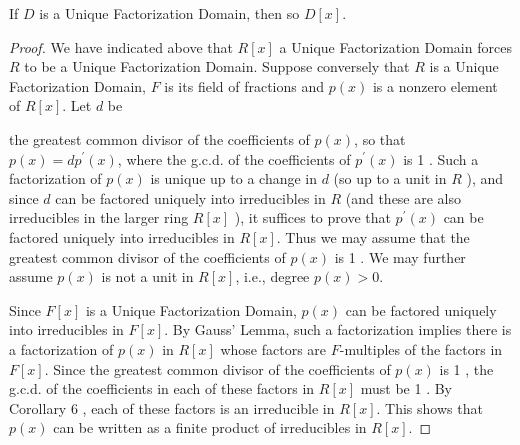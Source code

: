 \begin{theorem}
    If $D$ is a Unique Factorization Domain, then so $D[x]$.

    \begin{proof}
        We have indicated above that $R[x]$ a Unique Factorization Domain forces $R$ to be a Unique Factorization Domain. Suppose conversely that $R$ is a Unique Factorization Domain, $F$ is its field of fractions and $p(x)$ is a nonzero element of $R[x]$. Let $d$ be

        the greatest common divisor of the coefficients of $p(x)$, so that $p(x)=d p^{\prime}(x)$, where the g.c.d. of the coefficients of $p^{\prime}(x)$ is 1 . Such a factorization of $p(x)$ is unique up to a change in $d$ (so up to a unit in $R$ ), and since $d$ can be factored uniquely into irreducibles in $R$ (and these are also irreducibles in the larger ring $R[x]$ ), it suffices to prove that $p^{\prime}(x)$ can be factored uniquely into irreducibles in $R[x]$. Thus we may assume that the greatest common divisor of the coefficients of $p(x)$ is 1 . We may further assume $p(x)$ is not a unit in $R[x]$, i.e., degree $p(x)>0$.

        Since $F[x]$ is a Unique Factorization Domain, $p(x)$ can be factored uniquely into irreducibles in $F[x]$. By Gauss' Lemma, such a factorization implies there is a factorization of $p(x)$ in $R[x]$ whose factors are $F$-multiples of the factors in $F[x]$. Since the greatest common divisor of the coefficients of $p(x)$ is 1 , the g.c.d. of the coefficients in each of these factors in $R[x]$ must be 1 . By Corollary 6 , each of these factors is an irreducible in $R[x]$. This shows that $p(x)$ can be written as a finite product of irreducibles in $R[x]$.


\end{proof}
\end{theorem}
